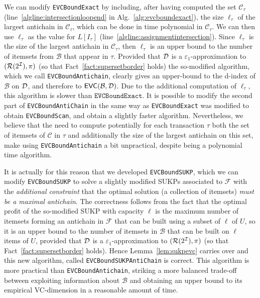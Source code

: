 We can modify \texttt{EVCBoundExact} by including, after having computed the
set $\mathcal{C}_\tau$ (line~\ref{algline:intersectionloopend} in
Alg.~\ref{alg:evcboundexact}), the size $\ell_\tau$ of the largest antichain in
$\mathcal{C}_\tau$, which can be done in time polynomial in $\mathcal{C}_\tau$.
We can then use $\ell_\tau$ as the value for $L[I_\tau]$
(line~\ref{algline:assignmentintersection}). Since $\ell_\tau$ is the size of
the largest antichain in $\mathcal{C}_\tau$, then $\ell_\tau$ is an upper bound
to the number of itemsets from $\mathcal{B}$ that appear in $\tau$. Provided
that ${\cal D}$ is a $\varepsilon_1$-approximation to $(\mathcal{R}(2^{\cal I}),\pi)$ (so
that Fact~\ref{fact:supersetborder} holds) the so-modified algorithm, which we
call \texttt{EVCBoundAntichain}, clearly gives an upper-bound to the d-index of
$\mathcal{B}$ on ${\cal D}$, and therefore to $\mathsf{EVC}(\mathcal{B},{\cal D})$. Due to the
additional computation of $\ell_\tau$, this algorithm is slower than
$\texttt{EVCBoundExact}$. It is possible to modify the second part of
\texttt{EVCBoundAntiChain} in the same way as \texttt{EVCBoundExact} was
modified to obtain \texttt{EVCBoundScan}, and obtain a slightly faster
algorithm. Nevertheless, we believe that the need to compute potentially for
each transaction $\tau$ both the set of itemsets of $\mathcal{C}$ in $\tau$ and
additionally the size of the largest antichain on this set, make using
\texttt{EVCBoundAntichain} a bit unpractical, despite being a polynomial time
algorithm.

It is actually for this reason that we developed \texttt{EVCBoundSUKP}, which we
can modify \texttt{EVCBoundSUKP} to solve a slightly modified SUKPs associated
to $\mathcal{F}$ with the \emph{additional constraint} that the optimal solution
(a collection of itemsets) \emph{must be a maximal antichain}. The correctness
follows from the fact that the optimal profit of the so-modified SUKP with
capacity $\ell$ is the maximum number of itemsets forming an antichain in
$\mathcal{F}$ that can be built using a subset of $\ell$ of $U$, so it is an
upper bound to the number of itemsets in $\mathcal{B}$ that can be built on
$\ell$ items of $U$, provided that ${\cal D}$ is a $\varepsilon_1$-approximation to
$(\mathcal{R}(2^{\cal I}),\pi)$ (so that Fact~\ref{fact:supersetborder} holds). Hence
Lemma~\ref{lem:sukpevc} carries over and this new algorithm, called
\texttt{EVCBoundSUKPAntiChain} is correct. This algorithm is more practical than
\texttt{EVCBoundAntichain}, striking a more balanced trade-off between
exploiting information about $\mathcal{B}$ and obtaining an upper bound to its
empirical VC-dimension in a reasonable amount of time.
